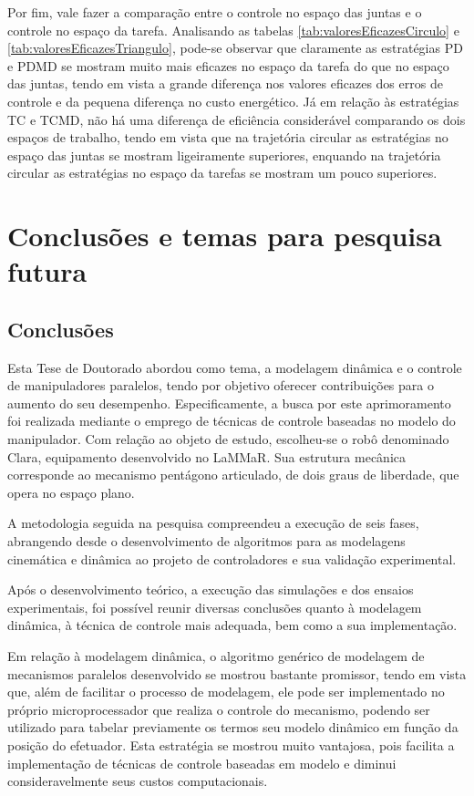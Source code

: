 \documentclass[]{politex}
\begin{document}
Por fim, vale fazer a comparação entre o controle no espaço das juntas e o controle no espaço da tarefa. Analisando as tabelas \ref{tab:valoresEficazesCirculo} e \ref{tab:valoresEficazesTriangulo}, pode-se observar que claramente as estratégias PD e PDMD se mostram muito mais eficazes no espaço da tarefa do que no espaço das juntas, tendo em vista a grande diferença nos valores eficazes dos erros de controle e da pequena diferença no custo energético. Já em relação às estratégias TC e TCMD, não há uma diferença de eficiência considerável comparando os dois espaços de trabalho, tendo em vista que na trajetória circular as estratégias no espaço das juntas se mostram ligeiramente superiores, enquando na trajetória circular as estratégias no espaço da tarefas se mostram um pouco superiores.




\chapter{Conclusões e temas para pesquisa futura}

\section{Conclusões}

Esta Tese de Doutorado abordou como tema, a modelagem dinâmica e o controle de manipuladores paralelos, tendo por objetivo oferecer contribuições para o aumento do seu desempenho. Especificamente, a busca por este aprimoramento foi realizada mediante o emprego de técnicas de controle baseadas no modelo do manipulador. Com relação ao objeto de estudo, escolheu-se o robô denominado Clara, equipamento desenvolvido no LaMMaR. Sua estrutura mecânica corresponde ao mecanismo pentágono articulado, de dois graus de liberdade, que opera no espaço plano. 

A metodologia seguida na pesquisa compreendeu a execução de seis fases, abrangendo desde o desenvolvimento de algoritmos para as modelagens cinemática e dinâmica ao projeto de controladores e sua validação experimental.

Após o desenvolvimento teórico, a execução das simulações e dos ensaios experimentais, foi possível reunir diversas conclusões quanto à modelagem dinâmica, à técnica de controle mais adequada, bem como a sua implementação.

Em relação à modelagem dinâmica, o algoritmo genérico de modelagem de mecanismos paralelos desenvolvido se mostrou bastante promissor, tendo em vista que, além de facilitar o processo de modelagem, ele pode ser implementado no próprio microprocessador que realiza o controle do mecanismo, podendo ser utilizado para tabelar previamente os termos seu modelo dinâmico em função da posição do efetuador. Esta estratégia se mostrou muito vantajosa, pois facilita a implementação de técnicas de controle baseadas em modelo e diminui consideravelmente seus custos computacionais.
\end{document}
